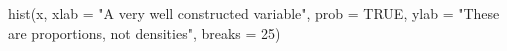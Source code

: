 \begin{Schunk}
\begin{Sinput}
 hist(x, xlab = "A very well constructed variable", prob = TRUE, ylab = "These are proportions, not densities", breaks = 25)
\end{Sinput}
\end{Schunk}
